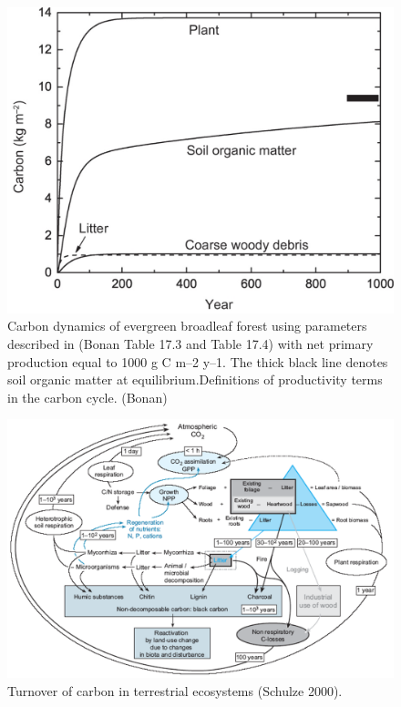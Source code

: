 \documentclass[12pt,oneside]{book}
\begin{document}
\begin{figure}

{\centering \includegraphics[width=0.8\linewidth]{figures/chap5/f55_casa_result} 

}

\caption{Carbon dynamics of evergreen broadleaf forest using parameters described in (Bonan Table 17.3 and Table 17.4) with net primary production equal to 1000 g C m–2 y–1. The thick black line denotes soil organic matter at equilibrium.Definitions of productivity terms in the carbon cycle. (Bonan)}\label{fig:f55}
\end{figure}

\begin{figure}

{\centering \includegraphics[width=0.8\linewidth]{figures/chap5/f56_turnover} 

}

\caption{Turnover of carbon in terrestrial ecosystems (Schulze 2000).}\label{fig:f56}
\end{figure}
\end{document}
